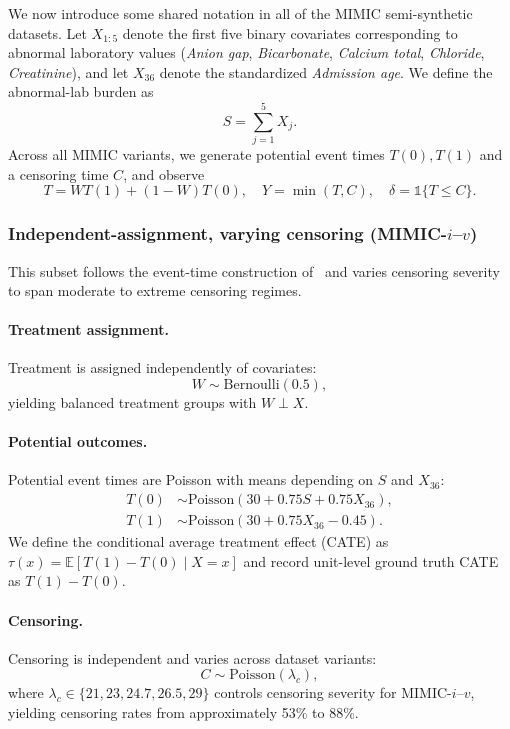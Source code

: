 \documentclass{article} %
\newcommand{\ind}{\mathds{1}}
\begin{document}
We now introduce some shared notation in all of the MIMIC semi-synthetic datasets.
Let $X_{1:5}$ denote the first five binary covariates corresponding to abnormal laboratory values
(\textit{Anion gap}, \textit{Bicarbonate}, \textit{Calcium total}, \textit{Chloride}, \textit{Creatinine}),
and let $X_{36}$ denote the standardized \textit{Admission age}. We define the abnormal-lab burden as
\[
S = \sum_{j=1}^{5} X_j.
\]
Across all MIMIC variants, we generate potential event times $T(0),T(1)$ and a censoring time $C$, and observe
\[
T = W T(1) + (1-W)T(0),\quad Y=\min(T,C),\quad \delta=\ind\{T\le C\}.
\]

\clearpage
\subsubsection{Independent-assignment, varying censoring (MIMIC-$i$--$v$)}
\label{app:mimic-i-v}
This subset follows the event-time construction of~\citet{meir2025heterogeneous} and varies censoring severity to span moderate to extreme censoring regimes.

\paragraph{Treatment assignment.}
Treatment is assigned independently of covariates:
\[
W \sim \mathrm{Bernoulli}(0.5),
\]
yielding balanced treatment groups with $W \perp X$.

\paragraph{Potential outcomes.}
Potential event times are Poisson with means depending on $S$ and $X_{36}$:
\begin{align*}
    T(0) &\sim \mathrm{Poisson}\!\left(30 + 0.75 S + 0.75 X_{36}\right), \\
    T(1) &\sim \mathrm{Poisson}\!\left(30 + 0.75 X_{36} - 0.45\right).
\end{align*}
We define the conditional average treatment effect (CATE) as $\tau(x)=\mathbb{E}[T(1)-T(0)\mid X=x]$ and record unit-level ground truth CATE as $T(1)-T(0)$.

\paragraph{Censoring.}
Censoring is independent and varies across dataset variants:
\[
C \sim \mathrm{Poisson}(\lambda_c),
\]
where $\lambda_c \in \{21, 23, 24.7, 26.5, 29\}$ controls censoring severity for MIMIC-$i$--$v$, yielding censoring rates from approximately 53\% to 88\%.
\end{document}
